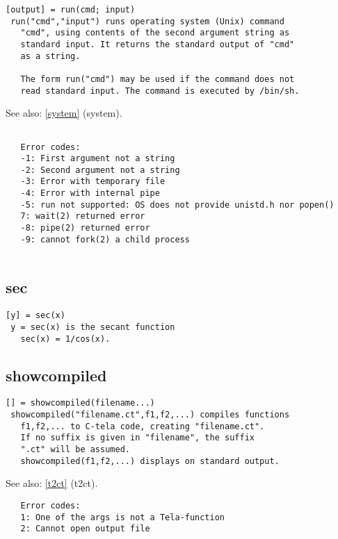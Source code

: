 \documentclass[a4paper]{article}
\begin{document}
\begin{tscreen}
\begin{verbatim}
[output] = run(cmd; input)
 run("cmd","input") runs operating system (Unix) command
   "cmd", using contents of the second argument string as
   standard input. It returns the standard output of "cmd"
   as a string.

   The form run("cmd") may be used if the command does not
   read standard input. The command is executed by /bin/sh.
\end{verbatim}

See also: \ref{system} {(system)}.
\begin{verbatim}

   Error codes:
   -1: First argument not a string
   -2: Second argument not a string
   -3: Error with temporary file
   -4: Error with internal pipe
   -5: run not supported: OS does not provide unistd.h nor popen()
   7: wait(2) returned error
   -8: pipe(2) returned error
   -9: cannot fork(2) a child process
   
\end{verbatim}
\end{tscreen}



\subsection{sec\label{sec}}

\begin{tscreen}
\begin{verbatim}
[y] = sec(x)
 y = sec(x) is the secant function
   sec(x) = 1/cos(x). 
\end{verbatim}
\end{tscreen}



\subsection{showcompiled\label{showcompiled}}

\begin{tscreen}
\begin{verbatim}
[] = showcompiled(filename...)
 showcompiled("filename.ct",f1,f2,...) compiles functions
   f1,f2,... to C-tela code, creating "filename.ct".
   If no suffix is given in "filename", the suffix
   ".ct" will be assumed.
   showcompiled(f1,f2,...) displays on standard output.
\end{verbatim}

See also: \ref{t2ct} {(t2ct)}.
\begin{verbatim}
   Error codes:
   1: One of the args is not a Tela-function
   2: Cannot open output file
   
\end{verbatim}
\end{tscreen}
\end{document}
